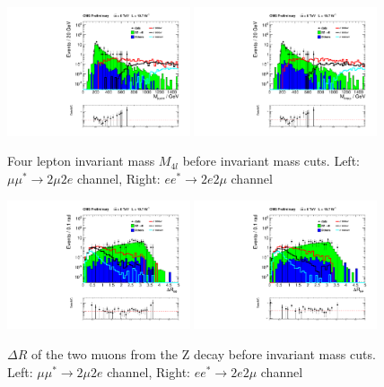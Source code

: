 \begin{figure}[hp!]
\begin{center}
\includegraphics[width=0.48\textwidth]{plot/Minv_2mu2e.pdf} 
\includegraphics[width=0.48\textwidth]{plot/Minv_2e2mu.pdf}
\end{center}
\caption{\label{fig:Minv4mu}Four lepton invariant mass $M_{4l}$ before invariant mass cuts. Left: $\mu\mu^{*}\rightarrow 2\mu2e$ channel, Right: $ee^{*}\rightarrow 2e2\mu$ channel}
\end{figure}


\begin{figure}[hp!]
\begin{center}
\includegraphics[width=0.48\textwidth]{plot/dR_Z_2mu2e.pdf} 
\includegraphics[width=0.48\textwidth]{plot/dR_Z_2e2mu.pdf}
\end{center}
\caption{\label{fig:ZdR}$\Delta R$ of the two muons from the Z decay before invariant mass cuts. Left: $\mu\mu^{*}\rightarrow 2\mu2e$ channel, Right: $ee^{*}\rightarrow 2e2\mu$ channel}
\end{figure}

